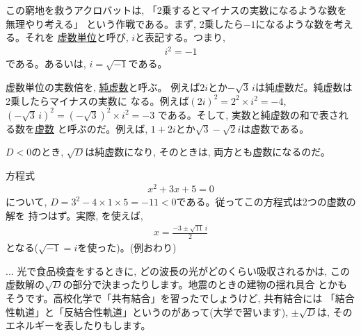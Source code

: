 この窮地を救うアクロバットは, 「2乗するとマイナスの実数になるような数を無理やり考える」
という作戦である。まず, 2乗したら$-1$になるような数を考える。それを
\underline{虚数単位}と呼び, $i$と表記する。つまり,
\begin{eqnarray}
i^2=-1\label{eq:imaginary}
\end{eqnarray}
である。あるいは, $i=\sqrt{-1}$である。

虚数単位の実数倍を, \underline{純虚数}と呼ぶ。
例えば$2i$とか$-\sqrt{3}\,i$は純虚数だ。純虚数は2乗したらマイナスの実数に
なる。例えば$(2i)^2=2^2\times i^2=-4$, $(-\sqrt{3}\,i)^2=(-\sqrt{3})^2\times i^2=-3$
である。そして, 実数と純虚数の和で表される数を\underline{虚数}
と呼ぶのだ。例えば, $1+2i$とか$\sqrt{3}-\sqrt{2}i$は虚数である。

$D<0$のとき, $\sqrt{D}$は純虚数になり, そのときは, 
両方とも虚数になるのだ。\mv

\begin{exmpl} 方程式
\begin{eqnarray}x^2+3x+5=0\end{eqnarray}
について, $D=3^2-4\times1\times5=-11<0$である。従ってこの方程式は2つの虚数の解を
持つはず。実際, を使えば, 
\begin{eqnarray}
x=\frac{-3\pm\sqrt{11}\,i}{2}
\end{eqnarray}
となる($\sqrt{-1}=i$を使った)。(例おわり)\end{exmpl}

\begin{faq}{\small{}
... 光で食品検査をするときに, どの波長の光がどのくらい吸収されるかは, 
この虚数解の$\sqrt{D}$の部分で決まったりします。地震のときの建物の揺れ具合
とかもそうです。高校化学で「共有結合」を習ったでしょうけど, 共有結合には
「結合性軌道」と「反結合性軌道」というのがあって(大学で習います), 
$\pm\sqrt{D}$は, そのエネルギーを表したりもします。}\end{faq}
\mv

